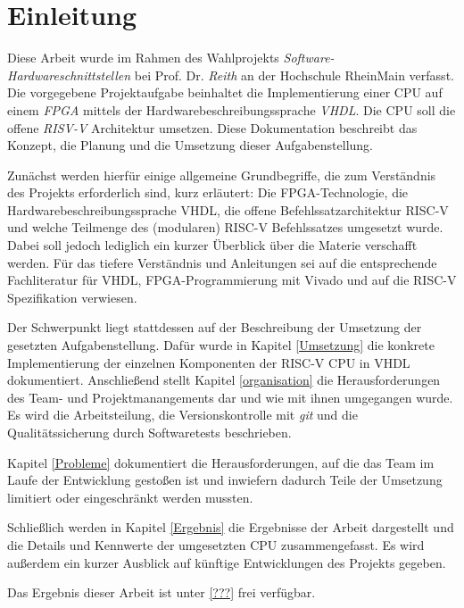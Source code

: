 \chapter{Einleitung} %
\label{Einleitung} %


\newcommand{\keyword}[1]{\textbf{#1}}
\newcommand{\tabhead}[1]{\textbf{#1}}
\newcommand{\code}[1]{\texttt{#1}}
\newcommand{\file}[1]{\texttt{\bfseries#1}}
\newcommand{\option}[1]{\itshape#1}

Diese Arbeit wurde im Rahmen des Wahlprojekts \textit{Software- Hardwareschnittstellen} bei Prof. Dr. \emph{Reith} an der Hochschule RheinMain verfasst. Die vorgegebene Projektaufgabe beinhaltet die Implementierung einer CPU auf einem \emph{FPGA} mittels der Hardwarebeschreibungssprache \emph{VHDL}. Die CPU soll die offene \emph{RISV-V} Architektur umsetzen. Diese Dokumentation beschreibt das Konzept, die Planung und die Umsetzung dieser Aufgabenstellung.

Zunächst werden hierfür einige allgemeine Grundbegriffe, die zum Verständnis des Projekts erforderlich sind, kurz erläutert: Die FPGA-Technologie, die Hardwarebeschreibungssprache VHDL, die offene Befehlssatzarchitektur RISC-V und welche Teilmenge des (modularen) RISC-V Befehlssatzes umgesetzt wurde. Dabei soll jedoch lediglich ein kurzer Überblick über die Materie verschafft werden. Für das tiefere Verständnis und Anleitungen sei auf die entsprechende Fachliteratur für VHDL\citep{Ashenden:609207}, FPGA-Programmierung\cite{Chu} mit Vivado\cite{churiwala} und auf die RISC-V Spezifikation\citep{RISC} verwiesen.

Der Schwerpunkt liegt stattdessen auf der Beschreibung der Umsetzung der gesetzten Aufgabenstellung. Dafür wurde in Kapitel \ref{Umsetzung} die konkrete Implementierung der einzelnen Komponenten der RISC-V CPU in VHDL dokumentiert. Anschließend stellt Kapitel \ref{organisation} die Herausforderungen des Team- und Projektmanangements dar und wie mit ihnen umgegangen wurde. Es wird die Arbeitsteilung, die Versionskontrolle mit \emph{git} und die Qualitätssicherung durch Softwaretests beschrieben.

Kapitel \ref{Probleme} dokumentiert die Herausforderungen, auf die das Team im Laufe der Entwicklung gestoßen ist und inwiefern dadurch Teile der Umsetzung limitiert oder eingeschränkt werden mussten. 

Schließlich werden in Kapitel \ref{Ergebnis} die Ergebnisse der Arbeit dargestellt und die Details und Kennwerte der umgesetzten CPU zusammengefasst. Es wird außerdem ein kurzer Ausblick auf künftige Entwicklungen des Projekts gegeben.

Das Ergebnis dieser Arbeit ist unter \ref{???} frei verfügbar.
